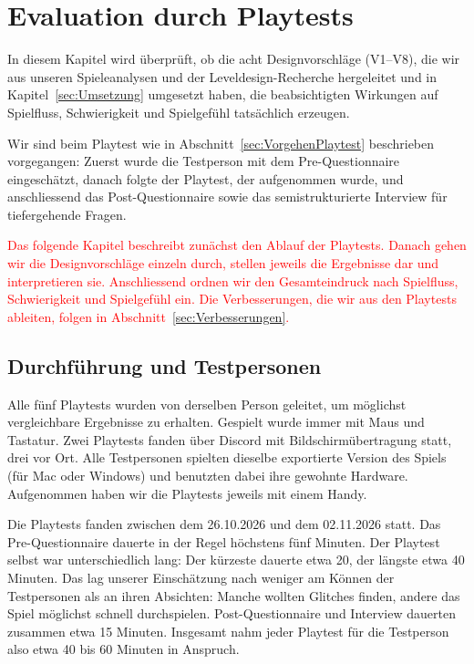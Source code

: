 \documentclass[../Main.tex]{subfiles}
\begin{document}
\section{Evaluation durch Playtests} \label{sec:Evaluation}

In diesem Kapitel wird überprüft, ob die acht Designvorschläge (V1--V8), die wir aus unseren Spieleanalysen und der Leveldesign-Recherche hergeleitet und in Kapitel~\ref{sec:Umsetzung} umgesetzt haben, die beabsichtigten Wirkungen auf Spielfluss, Schwierigkeit und Spielgefühl tatsächlich erzeugen.

Wir sind beim Playtest wie in Abschnitt~\ref{sec:VorgehenPlaytest} beschrieben vorgegangen: Zuerst wurde die Testperson mit dem Pre-Questionnaire eingeschätzt, danach folgte der Playtest, der aufgenommen wurde, und anschliessend das Post-Questionnaire sowie das semistrukturierte Interview für tiefergehende Fragen.

\textcolor{red}{Das folgende Kapitel beschreibt zunächst den Ablauf der Playtests. Danach gehen wir die Designvorschläge einzeln durch, stellen jeweils die Ergebnisse dar und interpretieren sie. Anschliessend ordnen wir den Gesamteindruck nach Spielfluss, Schwierigkeit und Spielgefühl ein. Die Verbesserungen, die wir aus den Playtests ableiten, folgen in Abschnitt~\ref{sec:Verbesserungen}.}

\subsection{Durchführung und Testpersonen} \label{sec:Durchfuehrung}

Alle fünf Playtests wurden von derselben Person geleitet, um möglichst vergleichbare Ergebnisse zu erhalten. Gespielt wurde immer mit Maus und Tastatur. Zwei Playtests fanden über Discord mit Bildschirmübertragung statt, drei vor Ort. Alle Testpersonen spielten dieselbe exportierte Version des Spiels (für Mac oder Windows) und benutzten dabei ihre gewohnte Hardware. Aufgenommen haben wir die Playtests jeweils mit einem Handy.

Die Playtests fanden zwischen dem 26.10.2026 und dem 02.11.2026 statt. Das Pre-Questionnaire dauerte in der Regel höchstens fünf Minuten. Der Playtest selbst war unterschiedlich lang: Der kürzeste dauerte etwa 20, der längste etwa 40 Minuten. Das lag unserer Einschätzung nach weniger am Können der Testpersonen als an ihren Absichten: Manche wollten Glitches finden, andere das Spiel möglichst schnell durchspielen. Post-Questionnaire und Interview dauerten zusammen etwa 15 Minuten. Insgesamt nahm jeder Playtest für die Testperson also etwa 40 bis 60 Minuten in Anspruch.
\end{document}
